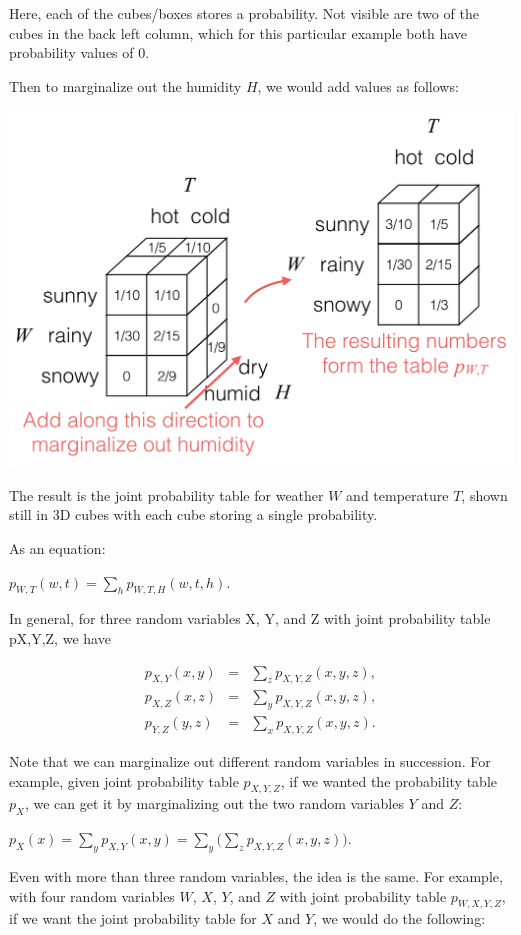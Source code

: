 \documentclass[6008notes.tex]{subfiles}
\begin{document}
Here, each of the cubes/boxes stores a probability. Not visible are two of the cubes in the back left column, which for this particular example both have probability values of 0.

Then to marginalize out the humidity $H$, we would add values as follows:

{\centering\includegraphics[scale=0.4]{images_sec-joint-rv-marg-many-rv-marg}}

The result is the joint probability table for weather $W$ and temperature $T$, shown still in 3D cubes with each cube storing a single probability.

As an equation:

$p_{W,T}(w,t) = \sum _ h p_{W,T,H}(w, t, h).$
 
In general, for three random variables X, Y, and Z with joint probability table pX,Y,Z, we have

\begin{eqnarray}
p_{X,Y}(x,y)
&=&
\sum_{z} p_{X,Y,Z}(x,y,z), \\
p_{X,Z}(x,z)
&=&
\sum_{y} p_{X,Y,Z}(x,y,z), \\
p_{Y,Z}(y,z)
&=&
\sum_{x} p_{X,Y,Z}(x,y,z).
\end{eqnarray}

Note that we can marginalize out different random variables in succession. For example, given joint probability table $p_{X,Y,Z}$, if we wanted the probability table $p_X$, we can get it by marginalizing out the two random variables $Y$ and $Z$:

$p_ X(x) = \sum _{y} p_{X,Y}(x,y) = \sum _{y} \Big( \sum _{z} p_{X,Y,Z}(x,y,z) \Big).$
 
Even with more than three random variables, the idea is the same. For example, with four random variables $W$, $X$, $Y$, and $Z$ with joint probability table $p_{W,X,Y,Z}$, if we want the joint probability table for $X$ and $Y$, we would do the following:
\end{document}
